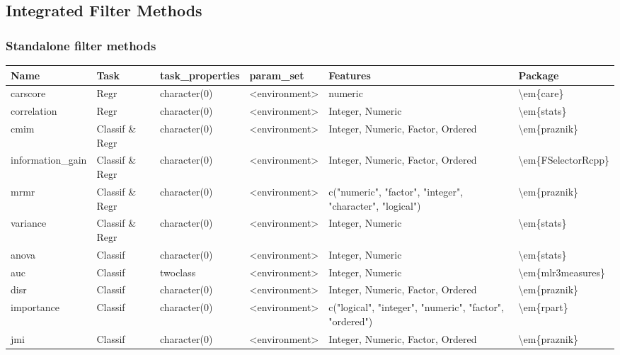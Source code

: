 \documentclass[]{article}
\begin{document}
\hypertarget{list-filters}{%
\subsection{Integrated Filter Methods}\label{list-filters}}

\hypertarget{fs-filter-list}{%
\subsubsection{Standalone filter methods}\label{fs-filter-list}}

\begin{table}[H]
\centering\begingroup\fontsize{12}{14}\selectfont

\begin{tabular}{l|l|l|l|l|l}
\hline
Name & Task & task\_properties & param\_set & Features & Package\\
\hline
carscore & Regr & character(0) & <environment> & numeric & \textbackslash{}em\{care\}\\
\hline
correlation & Regr & character(0) & <environment> & Integer, Numeric & \textbackslash{}em\{stats\}\\
\hline
cmim & Classif \& Regr & character(0) & <environment> & Integer, Numeric, Factor, Ordered & \textbackslash{}em\{praznik\}\\
\hline
information\_gain & Classif \& Regr & character(0) & <environment> & Integer, Numeric, Factor, Ordered & \textbackslash{}em\{FSelectorRcpp\}\\
\hline
mrmr & Classif \& Regr & character(0) & <environment> & c("numeric", "factor", "integer", "character", "logical") & \textbackslash{}em\{praznik\}\\
\hline
variance & Classif \& Regr & character(0) & <environment> & Integer, Numeric & \textbackslash{}em\{stats\}\\
\hline
anova & Classif & character(0) & <environment> & Integer, Numeric & \textbackslash{}em\{stats\}\\
\hline
auc & Classif & twoclass & <environment> & Integer, Numeric & \textbackslash{}em\{mlr3measures\}\\
\hline
disr & Classif & character(0) & <environment> & Integer, Numeric, Factor, Ordered & \textbackslash{}em\{praznik\}\\
\hline
importance & Classif & character(0) & <environment> & c("logical", "integer", "numeric", "factor", "ordered") & \textbackslash{}em\{rpart\}\\
\hline
jmi & Classif & character(0) & <environment> & Integer, Numeric, Factor, Ordered & \textbackslash{}em\{praznik\}\\

\end{tabular}
\end{table}
\end{document}
